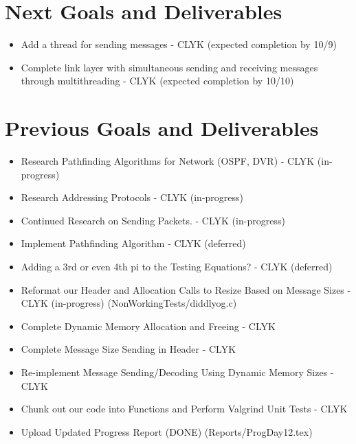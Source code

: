\documentclass{article}
\begin{document}
\section*{Next Goals and Deliverables}
\begin{itemize}
\item Add a thread for sending messages - CLYK (expected completion by 10/9)
\item Complete link layer with simultaneous sending and receiving messages through multithreading - CLYK (expected completion by 10/10)


\end{itemize}
\section*{Previous Goals and Deliverables}
\begin{itemize}
\item Research Pathfinding Algorithms for Network (OSPF, DVR) - CLYK (in-progress)
\item Research Addressing Protocols - CLYK (in-progress)
\item Continued Research on Sending Packets. - CLYK (in-progress)
\item Implement Pathfinding Algorithm - CLYK (deferred)
\item Adding a 3rd or even 4th pi to the Testing Equations? - CLYK (deferred)
\item Reformat our Header and Allocation Calls to Resize Based on Message Sizes - CLYK (in-progress) (NonWorkingTests/diddlyog.c)
\item Complete Dynamic Memory Allocation and Freeing - CLYK
\item Complete Message Size Sending in Header - CLYK
\item Re-implement Message Sending/Decoding Using Dynamic Memory Sizes - CLYK
\item Chunk out our code into Functions and Perform Valgrind Unit Tests - CLYK

\item Upload Updated Progress Report (DONE) (Reports/ProgDay12.tex)
\end{itemize}
\end{document}
